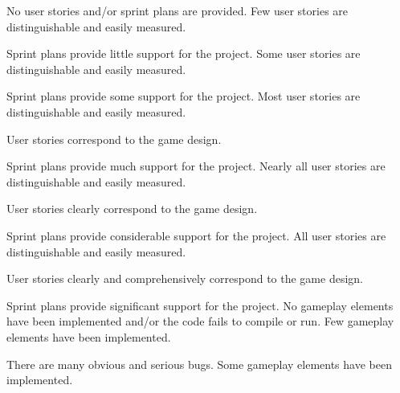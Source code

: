 \documentclass{../../fal_assignment}
\begin{document}
\begin{markingrubric}
%
        \grade\fail No user stories and/or sprint plans are provided.
        \grade Few user stories are distinguishable and easily measured.
            \par Sprint plans provide little support for the project.
        \grade Some user stories are distinguishable and easily measured.
            \par Sprint plans provide some support for the project.
        \grade Most user stories are distinguishable and easily measured.
            \par User stories correspond to the game design.
            \par Sprint plans provide much support for the project.
        \grade Nearly all user stories are distinguishable and easily measured.
            \par User stories clearly correspond to the game design.
            \par Sprint plans provide considerable support for the project.
        \grade All user stories are distinguishable and easily measured.
            \par User stories clearly and comprehensively correspond to the game design.
            \par Sprint plans provide significant support for the project.
%
        \grade\fail No gameplay elements have been implemented and/or the code fails to compile or run.
        \grade Few gameplay elements have been implemented.
            \par There are many obvious and serious bugs.
        \grade Some gameplay elements have been implemented.

\end{markingrubric}
\end{document}
